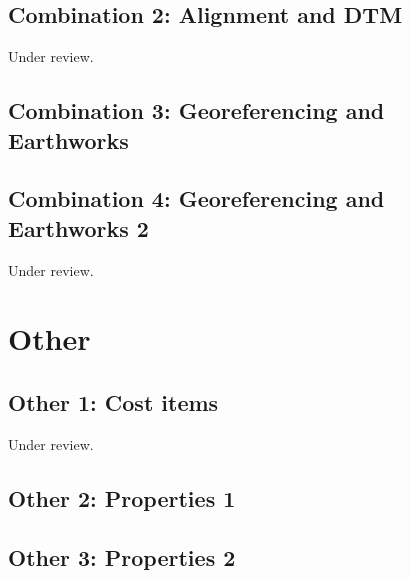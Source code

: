 \documentclass{scrartcl}
\begin{document}
\subsection{Combination 2: Alignment and DTM} %
\label{sec:align_dtm_2}
Under review.%
\clearpage

\subsection{Combination 3: Georeferencing and Earthworks}
\label{sec:georef_earth_1}
\clearpage

\subsection{Combination 4: Georeferencing and Earthworks 2} %
\label{sec:georef_earth_2}
Under review.%
\clearpage

\section{Other}
\label{sec:other}

\subsection{Other 1: Cost items} %
\label{sec:other_1}
Under review.%
\clearpage

\subsection{Other 2: Properties 1} %
\label{sec:other_2}
\clearpage

\subsection{Other 3: Properties 2} %
\label{sec:other_3}
\clearpage
\end{document}
